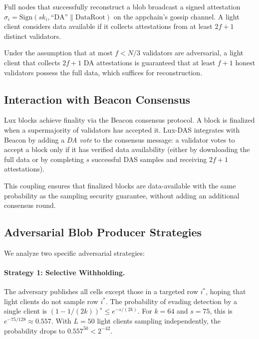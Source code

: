 \begin{definition}[DA Oracle]
Full nodes that successfully reconstruct a blob broadcast a signed attestation
$\sigma_i = \text{Sign}(sk_i, \text{``DA''} \| \text{DataRoot})$ on the appchain's gossip
channel. A light client considers data available if it collects attestations from at least
$2f+1$ distinct validators.
\end{definition}

\begin{lemma}
\label{lemma:partition}
Under the assumption that at most $f < N/3$ validators are adversarial, a light client
that collects $2f+1$ DA attestations is guaranteed that at least $f+1$ honest validators
possess the full data, which suffices for reconstruction.
\end{lemma}

\subsection{Interaction with Beacon Consensus}

Lux blocks achieve finality via the Beacon consensus protocol. A block is finalized
when a supermajority of validators has accepted it. Lux-DAS integrates with Beacon by
adding a \emph{DA vote} to the consensus message: a validator votes to accept a block only
if it has verified data availability (either by downloading the full data or by completing
$s$ successful DAS samples and receiving $2f+1$ attestations).

This coupling ensures that finalized blocks are data-available with the same probability
as the sampling security guarantee, without adding an additional consensus round.

\subsection{Adversarial Blob Producer Strategies}

We analyze two specific adversarial strategies:

\paragraph{Strategy 1: Selective Withholding.}
The adversary publishes all cells except those in a targeted row $i^*$, hoping that light
clients do not sample row $i^*$. The probability of evading detection by a single client is
$(1 - 1/(2k))^s \leq e^{-s/(2k)}$. For $k = 64$ and $s = 75$, this is $e^{-75/128} \approx 0.557$.
With $L = 50$ light clients sampling independently, the probability drops to $0.557^{50} < 2^{-42}$.

